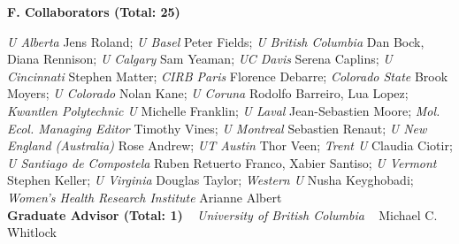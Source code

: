 


\vspace{4pt}	

\noindent \textbf{F. Collaborators (Total: 25)}
\vspace{2pt}	

\noindent \emph{U Alberta} Jens Roland; \emph{U Basel} Peter Fields; \emph{U British Columbia} Dan Bock, Diana Rennison; \emph{U Calgary} Sam Yeaman; \emph{UC Davis} Serena Caplins; \emph{U Cincinnati} Stephen Matter; \emph{CIRB Paris} Florence Debarre; \emph{Colorado State} Brook Moyers; \emph{U Colorado} Nolan Kane; \emph{U Coruna} Rodolfo Barreiro, Lua Lopez; \emph{Kwantlen Polytechnic U} Michelle Franklin; \emph{U Laval} Jean-Sebastien Moore; \emph{Mol. Ecol. Managing Editor} Timothy Vines; \emph{U Montreal} Sebastien Renaut; \emph{U New England (Australia)} Rose Andrew; \emph{UT Austin} Thor Veen; \emph{Trent U} Claudia Ciotir; \emph{U Santiago de Compostela} Ruben Retuerto Franco, Xabier Santiso; \emph{U Vermont} Stephen Keller; \emph{U Virginia} Douglas Taylor; \emph{Western U} Nusha Keyghobadi; \emph{Women's Health Research Institute} Arianne Albert\\



\noindent \textbf{Graduate Advisor (Total: 1)} ~ \emph{University of British Columbia} ~ Michael C. Whitlock






